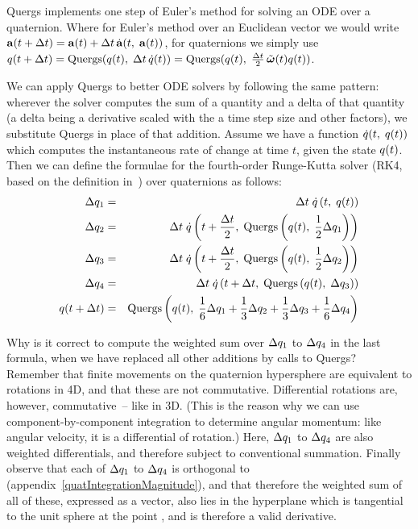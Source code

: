Quergs implements one step of Euler's method for solving an ODE over a quaternion.
Where for Euler's method over an Euclidean vector we would write
$\ve{a}(t + \Delta t) = \ve{a}(t) + \Delta t\,\dot{\ve{a}}(t,\;\ve{a}(t))$,
for quaternions we simply use
$\q{q}(t + \Delta t) = \mathrm{Quergs}(\q{q}(t),\; \Delta t\,\dot{\q{q}}(t)) =
    \mathrm{Quergs}(\q{q}(t),\; \frac{\Delta t}{2}\,\tilde{\ve{\omega}}(t)\q{q}(t))$.

We can apply Quergs to better ODE solvers by following the same pattern: wherever the solver
computes the sum of a quantity and a delta of that quantity (a delta being a derivative
scaled with the a time step size and other factors), we substitute Quergs in place of that
addition. Assume we have a function $\dot{q}(t,\; q(t))$ which computes the
instantaneous rate of change at time $t$, given the state $q(t)$. Then we can define
the formulae for the fourth-order Runge-Kutta solver (RK4, based on the definition
in~\cite{NRinC}) over quaternions as follows:
\begin{eqnarray*}
\Delta q_1 & = & \Delta t\;\dot{q}\left(t,\;q(t)\right) \\
\Delta q_2 & = & \Delta t\;\dot{q}\left(t + \frac{\Delta t}{2},\;
    \mathrm{Quergs}\left(q(t),\; \frac{1}{2}\Delta q_1\right)\right) \\
\Delta q_3 & = & \Delta t\;\dot{q}\left(t + \frac{\Delta t}{2},\;
    \mathrm{Quergs}\left(q(t),\; \frac{1}{2}\Delta q_2\right)\right) \\
\Delta q_4 & = & \Delta t\;\dot{q}\left(t + \Delta t,\;
    \mathrm{Quergs}\left(q(t),\; \Delta q_3\right)\right) \\
q(t + \Delta t) & = & \mathrm{Quergs}\left(q(t),\;
    \frac{1}{6}\Delta q_1 + \frac{1}{3}\Delta q_2 +
    \frac{1}{3}\Delta q_3 + \frac{1}{6}\Delta q_4\right)
\end{eqnarray*}

Why is it correct to compute the weighted sum over $\Delta q_1$ to
$\Delta q_4$ in the last formula, when we have replaced all other additions
by calls to Quergs? Remember that finite movements on the quaternion hypersphere are
equivalent to rotations in 4D, and that these are not commutative. Differential
rotations are, however, commutative~-- like in 3D. (This is the reason why we can
use component-by-component integration to determine angular momentum:
like angular velocity, it is a differential of rotation.) Here, $\Delta q_1$ to
$\Delta q_4$ are also weighted differentials, and therefore subject to
conventional summation. Finally observe that each of $\Delta q_1$ to
$\Delta q_4$ is orthogonal to  (appendix~\ref{quatIntegrationMagnitude}),
and that therefore the weighted sum of all of these, expressed as a vector, also
lies in the hyperplane which is tangential to the unit sphere at the point ,
and is therefore a valid derivative.
